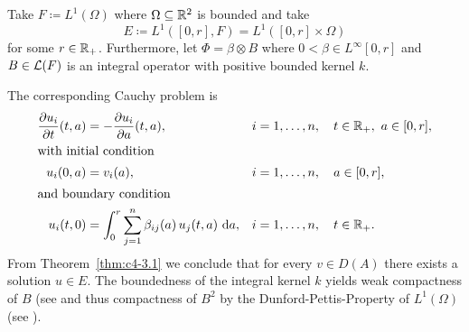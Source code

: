 \begin{example}\label{ex:c4-3.13}
%
Take $F \coloneqq L^{1}(\Omega)$ where $\Omega \subseteq \mathbb{R}^{2}$ is bounded and take
%
\[
	 E \coloneqq L^{1}([0,r], F) = L^{1}([0,r] \times \Omega)
\]
%
for some $r \in \mathbb{R}_{+}$.
Furthermore, let $\Phi = \beta \otimes B$ where $0 < \beta \in L^{\infty}[0,r]$ and $B \in \mathcal{L}(F)$ is an integral operator with positive bounded kernel $k$.

The corresponding Cauchy problem is
\begin{align}
\frac{\partial u_i}{\partial t}(t,a)
    &= -\frac{\partial u_i}{\partial a}(t,a),
    && i=1,\ldots,n,\quad t\in\mathbb{R}_+,\ a\in[0,r], \notag\\
\intertext{with initial condition}
u_i(0,a)
    &= v_i(a),
    && i=1,\ldots,n,\quad a\in[0,r], \label{eq:c4-3.14}\\
\intertext{and boundary condition}
u_i(t,0)
    &= \int_0^r \sum_{j=1}^n \beta_{ij}(a)\,u_j(t,a)\,\mathop{}\!\mathrm{d}{a},
    && i=1,\ldots,n,\quad t\in\mathbb{R}_+. \notag
\end{align}
From Theorem~\ref{thm:c4-3.1} we conclude that for every $v \in D(A)$ there exists a solution $u \in E$.
The boundedness of the integral kernel $k$ yields weak compactness of\/ $B$ (see \textcite[Section II.5]{schaefer:1974} and thus compactness of\/ $B^{2}$ by the Dunford-Pettis-Property of\/ $L^{1}(\Omega)$ (see \textcite[Chapter II, Theorem.9.9]{schaefer:1974}).


\end{example}
